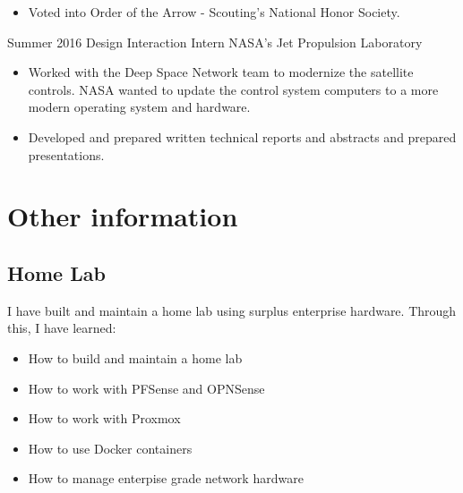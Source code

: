\documentclass[letterpaper]{twentysecondcv} %
\begin{document}
\begin{twenty}
{\begin{itemize}
			      responsible for maintaining the new websites.
			\item Voted into Order of the Arrow - Scouting's National Honor Society.
		\end{itemize}}
	\twentyitem
	{Summer 2016}
	{Design Interaction Intern}
	{NASA's Jet Propulsion Laboratory}
	{\begin{itemize}
			\item Worked with the Deep Space Network team to modernize the satellite controls.  NASA wanted to update the control system computers to a more modern operating system and hardware.
			\item Developed and prepared written technical reports and abstracts and prepared presentations.
		\end{itemize}}
\end{twenty}


\section{Other information}

\subsection{Home Lab}

I have built and maintain a home lab using surplus enterprise hardware.  Through this, I have learned:
\begin{itemize}
	\item How to build and maintain a home lab
	\item How to work with PFSense and OPNSense
	\item How to work with Proxmox
	\item How to use Docker containers
	\item How to manage enterpise grade network hardware
\end{itemize}

\end{document}
